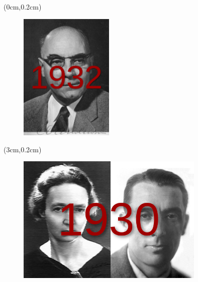 \documentclass[hyperref={pdfpagelabels=false}]{beamer}
\begin{document}
\begin{frame}[label=]
\frametitle{}
\begin{textblock*}{5cm}(0cm,0.2cm) %
\begin{figure}[H] 
  \centering
\includegraphics[width=0.4\textwidth]{../imgs/candersonp.jpg}
\label{fig:candersonpjpg}
  \end{figure}


\end{textblock*}

\begin{textblock*}{5cm}(3cm,0.2cm) %
\begin{figure}[H] 
  \centering
\includegraphics[width=0.8\textwidth]{../imgs/bcuriep.png}
\label{fig:bcurieppng}
  \end{figure}


\end{textblock*}


\end{frame}
\end{document}
